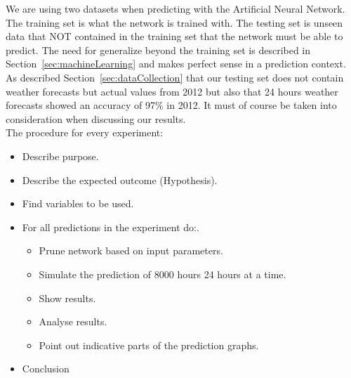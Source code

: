 We are using two datasets when predicting with the Artificial Neural Network. The training set is what the network is trained with. The testing set is unseen data that NOT contained in the training set that the network must be able to predict. The need for generalize beyond the training set is described in Section~\ref{sec:machineLearning} and makes perfect sense in a prediction context. As described Section~\ref{sec:dataCollection} that our testing set does not contain weather forecasts but actual values from 2012 but also that 24 hours weather forecasts showed an accuracy of 97\% in 2012. It must of course be taken into consideration when discussing our results.
\\[0.5cm]
The procedure for every experiment:
\begin{itemize}
\item Describe purpose.
\item Describe the expected outcome (Hypothesis).
\item Find variables to be used.
\item For all predictions in the experiment do:.
\begin{itemize}
	\item Prune network based on input parameters.
	\item Simulate the prediction of 8000 hours 24 hours at a time.
	\item Show results.
	\item Analyse results.
	\item Point out indicative parts of the prediction graphs.
\end{itemize}
\item Conclusion

\end{itemize}